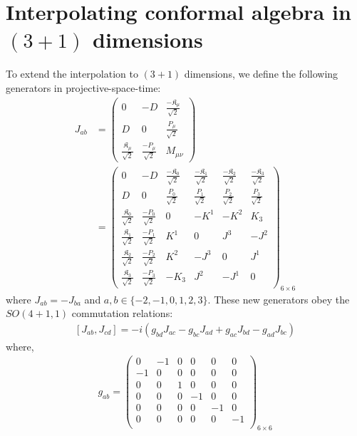 \documentclass[%
 reprint,
superscriptaddress,
 amsmath,amssymb,
 aps,
]{revtex4-2}
\begin{document}
\section{Interpolating conformal algebra in \texorpdfstring{$(3+1)$}{Lg} dimensions}
\label{conformalsimpler}
To extend the interpolation to \texorpdfstring{$(3+1)$}{Lg} dimensions, we define the following generators \cite{Francesco,Blumenhagen} in projective-space-time:
\begin{align}\label{Jab}
  J_{ab}&=
  \begin{pmatrix}
      0&-D&\frac{-\mathfrak{K}_{\mu}}{\sqrt{2}}\\
      D&0&\frac{P_{\mu}}{\sqrt{2}}\\
      \frac{\mathfrak{K}_{\mu}}{\sqrt{2}}&\frac{-P_{\mu}}{\sqrt{2}}&M_{\mu\nu}
  \end{pmatrix}\\
  &=
  \begin{pmatrix}
  0&-D&\frac{-\mathfrak{K}_0}{\sqrt{2}}&\frac{-\mathfrak{K}_1}{\sqrt{2}}&\frac{-\mathfrak{K}_2}{\sqrt{2}}&\frac{-\mathfrak{K}_3}{\sqrt{2}}\\
  D&0&\frac{P_0}{\sqrt{2}}&\frac{P_1}{\sqrt{2}}&\frac{P_2}{\sqrt{2}}&\frac{P_3}{\sqrt{2}}\\
    \frac{\mathfrak{K}_0}{\sqrt{2}}&\frac{-P_0}{\sqrt{2}}&0 & -K^{1} & -K^{2} & K_3\\
    \frac{\mathfrak{K}_1}{\sqrt{2}}&\frac{-P_1}{\sqrt{2}}&K^{1} & 0 & J^{3} & -J^{2}\\
    \frac{\mathfrak{K}_2}{\sqrt{2}}&\frac{-P_2}{\sqrt{2}}&K^{2} & -J^{3} & 0 & J^{1}\\
    \frac{\mathfrak{K}_3}{\sqrt{2}}&\frac{-P_3}{\sqrt{2}}&-K_3 & J^{2} & -J^{1} & 0
  \end{pmatrix}_{6\times6}
\end{align}
where $J_{ab}=-J_{ba}$ and $a,b\in\{-2,-1,0,1,2,3\}$. These new generators obey the $SO(4+1,1)$ commutation relations:
  \begin{align}\label{algebrasimp}
      \left[J_{{a}{b}},J_{{c}{d}}\right]=-i\left(g_{{b}{d}}J_{{a}{c}}-g_{{b}{c}}J_{{a}{d}}+g_{{a}{c}}J_{{b}{d}}-g_{{a}{d}}J_{{b}{c}}\right)
  \end{align}
where, 
  \begin{align}\label{metric}
      g_{ab}=\begin{pmatrix}
  0&-1&0&0&0&0\\
  -1&0&0&0&0&0\\
  0&0&1&0&0&0\\
  0&0&0&-1&0&0\\
  0&0&0&0&-1&0\\
  0&0&0&0&0&-1\\
  \end{pmatrix}_{6\times6}
  \end{align}
\end{document}
